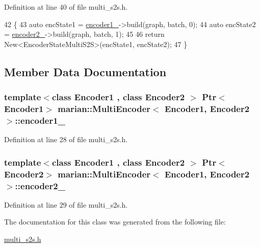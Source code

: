 Definition at line 40 of file multi\+\_\+s2s.\+h.


\begin{DoxyCode}
42                                                \{
43     \textcolor{keyword}{auto} encState1 = \hyperlink{classmarian_1_1MultiEncoder_a7c808bb36621b72f765ef2f8d35871be}{encoder1\_}->build(graph, batch, 0);
44     \textcolor{keyword}{auto} encState2 = \hyperlink{classmarian_1_1MultiEncoder_a7061cdd3f7b5c46d4519937a177a2878}{encoder2\_}->build(graph, batch, 1);
45 
46     \textcolor{keywordflow}{return} New<EncoderStateMultiS2S>(encState1, encState2);
47   \}
\end{DoxyCode}


\subsection{Member Data Documentation}
\subsubsection[{\texorpdfstring{encoder1\+\_\+}{encoder1_}}]{\setlength{\rightskip}{0pt plus 5cm}template$<$class Encoder1 , class Encoder2 $>$ {\bf Ptr}$<$Encoder1$>$ {\bf marian\+::\+Multi\+Encoder}$<$ Encoder1, Encoder2 $>$\+::encoder1\+\_\+\hspace{0.3cm}{\ttfamily [private]}}\hypertarget{classmarian_1_1MultiEncoder_a7c808bb36621b72f765ef2f8d35871be}{}\label{classmarian_1_1MultiEncoder_a7c808bb36621b72f765ef2f8d35871be}


Definition at line 28 of file multi\+\_\+s2s.\+h.

\subsubsection[{\texorpdfstring{encoder2\+\_\+}{encoder2_}}]{\setlength{\rightskip}{0pt plus 5cm}template$<$class Encoder1 , class Encoder2 $>$ {\bf Ptr}$<$Encoder2$>$ {\bf marian\+::\+Multi\+Encoder}$<$ Encoder1, Encoder2 $>$\+::encoder2\+\_\+\hspace{0.3cm}{\ttfamily [private]}}\hypertarget{classmarian_1_1MultiEncoder_a7061cdd3f7b5c46d4519937a177a2878}{}\label{classmarian_1_1MultiEncoder_a7061cdd3f7b5c46d4519937a177a2878}


Definition at line 29 of file multi\+\_\+s2s.\+h.



The documentation for this class was generated from the following file\+:\begin{DoxyCompactItemize}
\item 
\hyperlink{multi__s2s_8h}{multi\+\_\+s2s.\+h}\end{DoxyCompactItemize}
